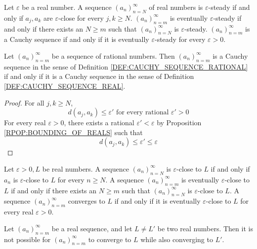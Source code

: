\documentclass{blog}
\begin{document}
\begin{definition}
  \label{DEF:CAUCHY_SEQUENCE_REAL}
  Let $\varepsilon$ be a real number.
  A sequence $(a_{n})_{n = N}^{\infty}$ of real numbers is $\varepsilon$-steady
  if and only if $a_{j}, a_{k}$ are $\varepsilon$-close for every $j, k \geq N$.
  $(a_{n})_{n = m}^{\infty}$ is eventually $\varepsilon$-steady
  if and only if there exists an $N \geq m$ such that
  $(a_{n})_{n = N}^{\infty}$ is $\varepsilon$-steady.
  $(a_{n})_{n = m}^{\infty}$ is a Cauchy sequence
  if and only if it is eventually $\varepsilon$-steady for every $\varepsilon > 0$.
\end{definition}

\begin{proposition}
  Let $(a_{n})_{n = m}^{\infty}$ be a sequence of rational numbers.
  Then $(a_{n})_{n = m}^{\infty}$ is a Cauchy sequence in the sense of
  Definition \ref{DEF:CAUCHY_SEQUENCE_RATIONAL}
  if and only if it is a Cauchy sequence in the sense of
  Definition \ref{DEF:CAUCHY_SEQUENCE_REAL}.
\end{proposition}

\begin{proof}
  For all $j, k \geq N$,
  \begin{equation*}
    d(a_{j}, a_{k}) \leq \varepsilon' \text{ for every rational } \varepsilon' > 0
  \end{equation*}
  For every real $\varepsilon > 0$, there exists a rational $\varepsilon' < \varepsilon$
  by Proposition \ref{RPOP:BOUNDING_OF_REALS} such that
  \begin{equation*}
    d(a_{j}, a_{k}) \leq \varepsilon' \leq \varepsilon
  \end{equation*}
\end{proof}

\begin{definition}[convergence]
  Let $\varepsilon > 0, L$ be real numbers.
  A sequence $(a_{n})_{n = N}^{\infty}$ is $\varepsilon$-close to $L$
  if and only if $a_{n}$ is $\varepsilon$-close to $L$ for every $n \geq N$.
  A sequence $(a_{n})_{n = m}^{\infty}$ is eventually $\varepsilon$-close to $L$
  if and only if there exists an $N \geq m$ such that
  $(a_{n})_{n = N}^{\infty}$ is $\varepsilon$-close to $L$.
  A sequence $(a_{n})_{n = m}^{\infty}$ converges to $L$
  if and only if it is eventually $\varepsilon$-close to $L$ for every real $\varepsilon > 0$.
\end{definition}

\begin{proposition}
  Let $(a_{n})_{n = m}^{\infty}$ be a real sequence,
  and let $L \neq L'$ be two real numbers.
  Then it is not possible for $(a_{n})_{n = m}^{\infty}$
  to converge to $L$ while also converging to $L'$.
\end{proposition}
\end{document}
